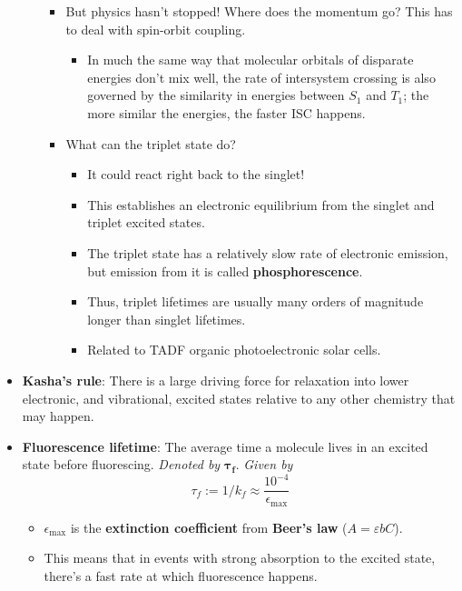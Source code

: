 \documentclass[../notes.tex]{subfiles}
\begin{document}
\begin{itemize}
\begin{itemize}
\begin{itemize}
\begin{itemize}
            \end{itemize}
            \item But physics hasn't stopped! Where does the momentum go? This has to deal with spin-orbit coupling.
            \begin{itemize}
                \item In much the same way that molecular orbitals of disparate energies don't mix well, the rate of intersystem crossing is also governed by the similarity in energies between $S_1$ and $T_1$; the more similar the energies, the faster ISC happens.
            \end{itemize}
            \item What can the triplet state do?
            \begin{itemize}
                \item It could react right back to the singlet!
                \item This establishes an electronic equilibrium from the singlet and triplet excited states.
                \item The triplet state has a relatively slow rate of electronic emission, but emission from it is called \textbf{phosphorescence}.
                \item Thus, triplet lifetimes are usually many orders of magnitude longer than singlet lifetimes.
                \item Related to TADF organic photoelectronic solar cells.
            \end{itemize}
        \end{itemize}
    \end{itemize}
    \item \textbf{Kasha's rule}: There is a large driving force for relaxation into lower electronic, and vibrational, excited states relative to any other chemistry that may happen.
    \item \textbf{Fluorescence lifetime}: The average time a molecule lives in an excited state before fluorescing. \emph{Denoted by} $\bm{\tau_f}$. \emph{Given by}
    \begin{equation*}
        \tau_f := 1/k_f \approx \frac{10^{-4}}{\epsilon_\text{max}}
    \end{equation*}
    \begin{itemize}
        \item $\epsilon_\text{max}$ is the \textbf{extinction coefficient} from \textbf{Beer's law} ($A=\varepsilon bC$).
        \item This means that in events with strong absorption to the excited state, there's a fast rate at which fluorescence happens.

\end{itemize}
\end{itemize}
\end{document}
